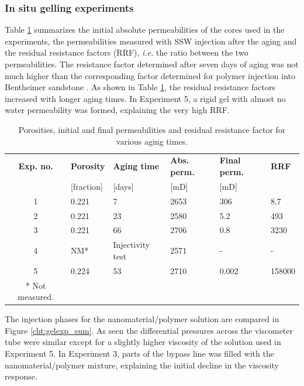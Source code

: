 \documentclass[energies,article,submit,moreauthors,pdftex]{Definitions/mdpi}
\begin{document}
\subsubsection{In situ gelling experiments \label{sec:insiteGel}}
Table \ref{tab:porPermAge} summarizes the initial absolute permeabilities of the cores used in the experiments, the permeabilities measured with SSW injection after the aging and the residual resistance factors (RRF), \textit{i.e.} the ratio between the two permeabilities. The resistance factor determined after seven days of aging was not much higher than the corresponding factor determined for polymer injection into Bentheimer sandstone \cite{Najafiazar2016}. As shown in Table \ref{tab:porPermAge}, the residual resistance factors increased with longer aging times. In Experiment 5, a rigid gel with almost no water permeability was formed, explaining the very high RRF.
\begin{table}[h!]
\small
\centering
\caption{Porosities, initial and final permeabilities and residual resistance factor for various aging times.}
\label{tab:porPermAge} %
\begin{tabular}{c l l l l l } 
\toprule
\textbf{Exp. no.} & \textbf{Porosity} & \textbf{Aging time} & \textbf{Abs. perm.} & \textbf{Final perm.} & \textbf{RRF} \\ 
 & [fraction] & [days] & [mD] & [mD] & \\
\midrule 
1  & 0.221   &  7     & 2653     & 306      & 8.7    \\
2  & 0.221   & 23     & 2580     & 5.2      & 493      \\ 
3  & 0.221   & 66     & 2706     & 0.8    & 3230   \\ 
4  & NM* & Injectivity test & 2571    & -        & -      \\
5  & 0.224   & 53     & 2710     & 0.002        & 158000      \\
\bottomrule
* Not measured.
\end{tabular}
\end{table}

The injection phases for the nanomaterial/polymer solution are compared in Figure \ref{cht:gelexp_sum}. As seen the differential pressures across the viscometer tube were similar except for a slightly higher viscosity of the solution used in Experiment 5. In Experiment 3, parts of the bypass line was filled with the nanomaterial/polymer mixture, explaining the initial decline in the viscosity response. 
\end{document}
